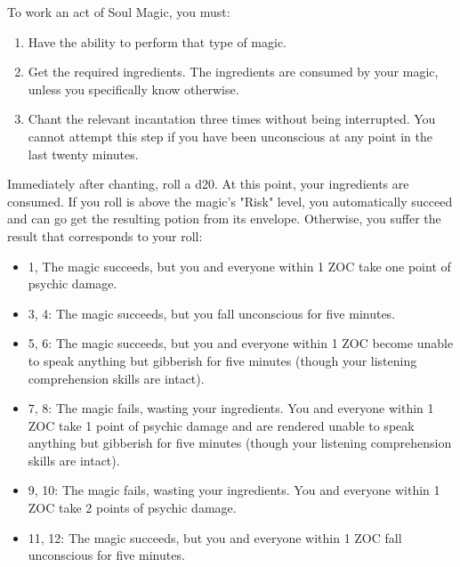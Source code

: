 \documentclass[green]{Kos}
\begin{document}
\name{\gButlerSoulMagic{}}


To work an act of Soul Magic, you must:

\begin{enumerate} 
\item Have the ability to perform that type of magic.
\item Get the required ingredients. The ingredients are consumed by your magic, unless you specifically know otherwise.
\item Chant the relevant incantation three times without being interrupted. You cannot attempt this step if you have been unconscious at any point in the last twenty minutes.
\end{enumerate}

Immediately after chanting, roll a d20. At this point, your ingredients are consumed. If you roll is above the magic's "Risk" level, you automatically succeed and can go get the resulting potion from its envelope. Otherwise, you suffer the result that corresponds to your roll:

\begin{itemize}
\item 1,  The magic succeeds, but you and everyone within 1 ZOC take one point of psychic damage.
\item 3, 4: The magic succeeds, but you fall unconscious for five minutes.
\item 5, 6: The magic succeeds, but you and everyone within 1 ZOC become unable to speak anything but gibberish for five minutes (though your listening comprehension skills are intact).
\item 7, 8: The magic fails, wasting your ingredients.  You and everyone within 1 ZOC take 1 point of psychic damage and are rendered unable to speak anything but gibberish for five minutes (though your listening comprehension skills are intact).
\item 9, 10: The magic fails, wasting your ingredients. You and everyone within 1 ZOC take 2 points of psychic damage.
\item 11, 12: The magic succeeds, but you and everyone within 1 ZOC fall unconscious for five minutes.
\end{itemize}
\end{document}
